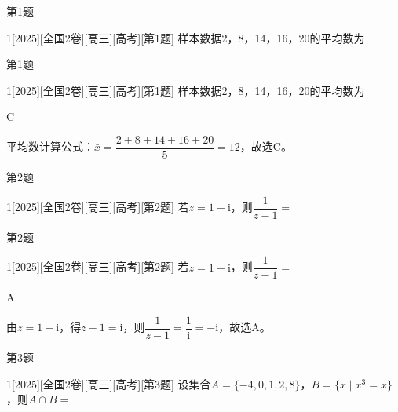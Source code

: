 \begin{frame}[allowframebreaks]{第1题}
\begin{example}{1}[2025][全国2卷][高三][高考][第1题]
样本数据2，8，14，16，20的平均数为\blankbox
\begin{choices}
\end{choices}
\end{example}
\end{frame}
\begin{frame}[allowframebreaks]{第1题}
\begin{example}{1}[2025][全国2卷][高三][高考][第1题]
样本数据2，8，14，16，20的平均数为\blankbox
\begin{choices}
\end{choices}
\end{example}
\begin{answer}
C
\end{answer}
\begin{solutions}
平均数计算公式：$\bar{x}=\dfrac{2+8+14+16+20}{5}=12$，故选C。
\end{solutions}
\end{frame}
\begin{frame}[allowframebreaks]{第2题}
\begin{example}{1}[2025][全国2卷][高三][高考][第2题]
若$z=1+\text{i}$，则$\dfrac{1}{z-1}=$\blankbox
\begin{choices}
\end{choices}
\end{example}
\end{frame}
\begin{frame}[allowframebreaks]{第2题}
\begin{example}{1}[2025][全国2卷][高三][高考][第2题]
若$z=1+\text{i}$，则$\dfrac{1}{z-1}=$\blankbox
\begin{choices}
\end{choices}
\end{example}
\begin{answer}
A
\end{answer}
\begin{solutions}
由$z=1+\text{i}$，得$z-1=\text{i}$，则$\dfrac{1}{z-1}=\dfrac{1}{\text{i}}=-\text{i}$，故选A。
\end{solutions}
\end{frame}
\begin{frame}[allowframebreaks]{第3题}
\begin{example}{1}[2025][全国2卷][高三][高考][第3题]
设集合$A=\{-4,0,1,2,8\}$，$B=\{x\mid x^3=x\}$，则$A\cap B=$\blankbox
\begin{choices}
\end{choices}
\end{example}
\end{frame}
